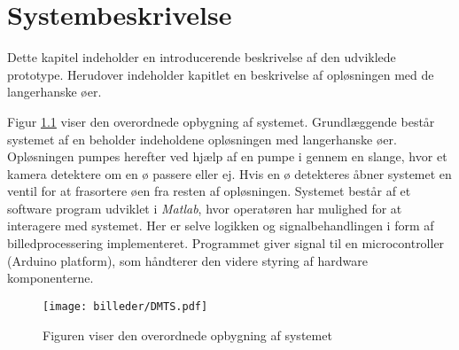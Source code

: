 \chapter{Systembeskrivelse}
Dette kapitel indeholder en introducerende beskrivelse af den udviklede prototype. Herudover indeholder kapitlet en beskrivelse af opløsningen med de langerhanske øer.

Figur \ref{fig:system} viser den overordnede opbygning af systemet. Grundlæggende består systemet af en beholder indeholdene opløsningen med langerhanske øer. Opløsningen pumpes herefter ved hjælp af en pumpe i gennem en slange, hvor et kamera detektere om en ø passere eller ej. Hvis en ø detekteres åbner systemet en ventil for at frasortere øen fra resten af opløsningen. Systemet består af et software program udviklet i \textit{Matlab}, hvor operatøren har mulighed for at interagere med systemet. Her er selve logikken og signalbehandlingen i form af billedprocessering implementeret. Programmet giver signal til en microcontroller (Arduino platform), som håndterer den videre styring af hardware komponenterne.

\begin{figure}[H]
	\centering
	\texttt{[image: billeder/DMTS.pdf]}
	\caption{Figuren viser den overordnede opbygning af systemet}
	\label{fig:system}
\end{figure}
%
%


%
%
%
%
%

